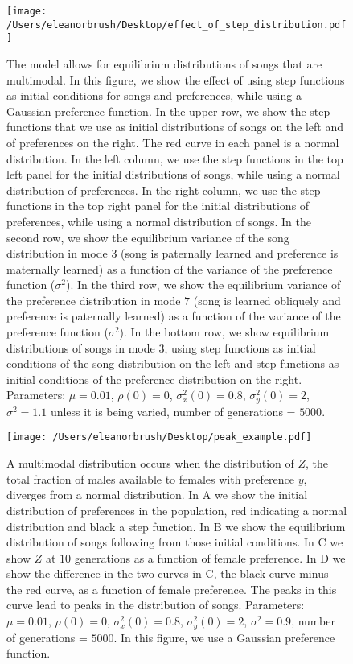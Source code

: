 \documentclass{article}
\begin{document}
\begin{figure}
\texttt{[image: /Users/eleanorbrush/Desktop/effect\_of\_step\_distribution.pdf]}
\caption{\label{effect_of_step_dist}The model allows for equilibrium distributions of songs that are multimodal. In this figure, we show the effect of using step functions as initial conditions for songs and preferences, while using a Gaussian preference function. In the upper row, we show the step functions that we use as initial distributions of songs on the left and of preferences on the right. The red curve in each panel is a normal distribution. 
In the left column, we use the step functions in the top left panel for the initial distributions of songs, while using a normal distribution of preferences. In the right column, we use the step functions in the top right panel for the initial distributions of preferences, while using a normal distribution of songs.  In the second row, we show the equilibrium variance of the song distribution in mode $3$ (song is paternally learned and preference is maternally learned) as a function of the variance of the preference function ($\sigma^2$). In the third row, we show the equilibrium variance of the preference distribution in mode $7$ (song is learned obliquely and preference is paternally learned) as a function of the variance of the preference function ($\sigma^2$). In the bottom row, we show equilibrium distributions of songs in mode $3$, using step functions as initial conditions of the song distribution on the left and step functions as initial conditions of the preference distribution on the right. Parameters: $\mu=0.01$, $\rho(0)=0$, $\sigma_x^2(0)=0.8$, $\sigma_y^2(0)=2$, $\sigma^2=1.1$ unless it is being varied, number of generations = $5000$. }
\end{figure}

\begin{figure}
\texttt{[image: /Users/eleanorbrush/Desktop/peak\_example.pdf]}
\caption{\label{peak_example}  A multimodal distribution occurs when the distribution of $Z$, the total fraction of males available to females with preference $y$, diverges from a normal distribution. In A we show the initial distribution of preferences in the population, red indicating a normal distribution and black a step function. In B we show the equilibrium distribution of songs following from those initial conditions. In C we show $Z$ at $10$ %
generations as a function of female preference. In D we show the difference in the two curves in C, the black curve minus the red curve, as a function of female preference. The peaks in this curve lead to peaks in the distribution of songs. Parameters: $\mu=0.01$, $\rho(0)=0$, $\sigma_x^2(0)=0.8$, $\sigma_y^2(0)=2$, $\sigma^2=0.9$, number of generations = $5000$. In this figure, we use a Gaussian preference function. 
}
\end{figure}
\end{document}
